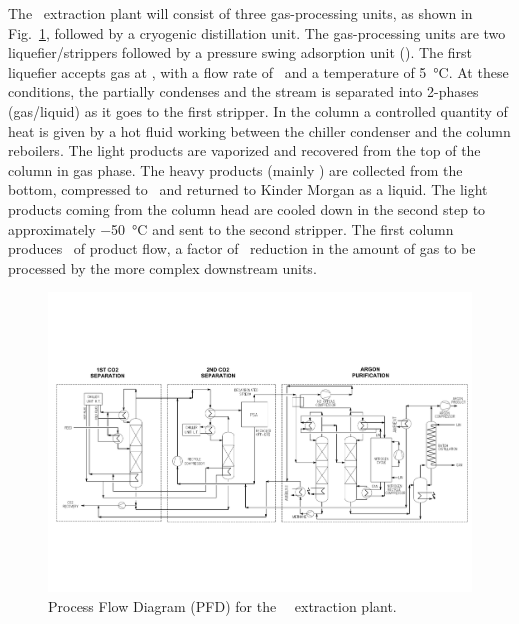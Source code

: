 The \UAr\ extraction plant will consist of three gas-processing units, as shown in Fig.~\ref{fig:Urania-PID}, followed by a cryogenic distillation unit.  The gas-processing units are two  liquefier/strippers followed by a pressure swing adsorption unit (\PSA).   The first liquefier accepts gas at \UraniaGasFeedAvePressure, with a flow rate of \UraniaGasFeedFlow\ and a temperature of \SI{5}{\celsius}.  At these conditions, the  partially condenses and the stream is separated into 2-phases (gas/liquid) as it goes to the first stripper.  In the column a controlled quantity of heat is given by a hot fluid working between the chiller condenser and the column reboilers.  The light products are vaporized and recovered from the top of the column in gas phase.  The heavy products (mainly ) are collected from the bottom, compressed to \UraniaGasReturnPressure\ and returned to Kinder Morgan as a liquid. The light products coming from the column head are cooled down in the second step to approximately \SI{-50}{\celsius} and sent to the second stripper.  The first column produces \UraniaFirstUnitOutputFlow\ of product flow, a factor of \UraniaFirstUnitFlowReduction\ reduction in the amount of gas to be processed by the more complex downstream units.  

\begin{figure}[!t]
\centering
\includegraphics[rotate=90, height=\textheight]{./Figures/Urania-PID.pdf}
\caption[Process Flow Diagram for the \Urania\ \UAr\ extraction plant]{Process Flow Diagram (PFD) for the \Urania\ \UAr\ extraction plant.}
\label{fig:Urania-PID}
\end{figure}

